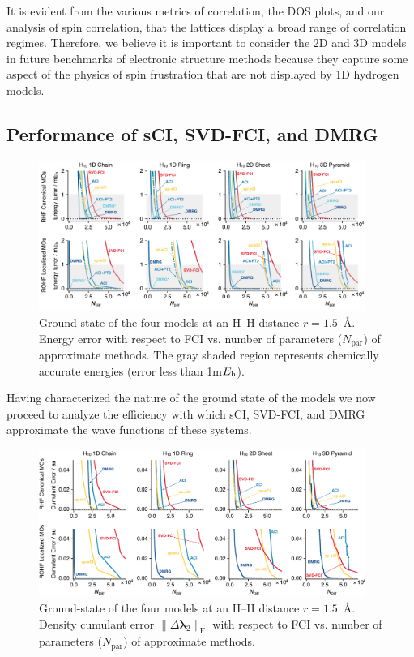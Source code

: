 \documentclass[aip,jcp,amsmath,amssymb, preprint]{revtex4-1}
\newcommand*{\Eh}{$E_{\rm h}$\xspace}
\providecommand{\norm}[1]{\lVert#1\rVert}
\begin{document}
It is evident from the various metrics of correlation, the DOS plots, and our analysis of spin correlation, that the  lattices display a broad range of correlation regimes.
Therefore, we believe it is important to consider the 2D and 3D models in future benchmarks of electronic structure methods because they capture some aspect of the physics of spin frustration that are not displayed by 1D hydrogen models.

\subsection{\label{H10compression} Performance of sCI, SVD-FCI, and DMRG}
\begin{figure}[ht]
\centering
\includegraphics[width=0.95\textwidth]{figure_4.pdf}
\caption{Ground-state of the four  models at an H--H distance $r = 1.5$~{\AA}. Energy error with respect to FCI vs. number of parameters ($N_\mathrm{par}$) of approximate methods. The gray shaded region represents chemically accurate energies (error less than 1m\Eh). }
\label{fig:h10compression_energy}
\end{figure}

Having characterized the nature of the ground state of the  models we now proceed to analyze the efficiency with which sCI, SVD-FCI, and DMRG approximate the wave functions of these systems. 

\begin{figure}[ht]
\centering
\includegraphics[width=0.95\textwidth]{figure_5.pdf}
\caption{Ground-state of the four  models at an H--H distance $r = 1.5$~{\AA}. Density cumulant error $ \norm{\Delta\pmb{\lambda}_{2}}_\mathrm{F}$ with respect to FCI vs. number of parameters ($N_\mathrm{par}$) of approximate methods.}
\label{fig:h10compression_cumulant}
\end{figure}
\end{document}

